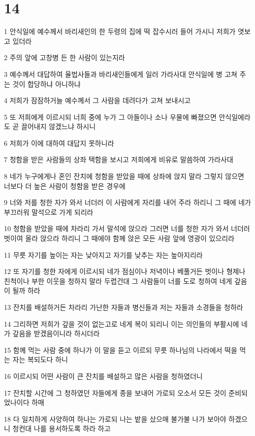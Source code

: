 \chapter{14}

\par 1 안식일에 예수께서 바리새인의 한 두령의 집에 떡 잡수시러 들어 가시니 저희가 엿보고 있더라
\par 2 주의 앞에 고창병 든 한 사람이 있는지라
\par 3 예수께서 대답하여 율법사들과 바리새인들에게 일러 가라사대 안식일에 병 고쳐 주는 것이 합당하냐 아니하냐
\par 4 저희가 잠잠하거늘 예수께서 그 사람을 데려다가 고쳐 보내시고
\par 5 또 저희에게 이르시되 너희 중에 누가 그 아들이나 소나 우물에 빠졌으면 안식일에라도 곧 끌어내지 않겠느냐 하시니
\par 6 저희가 이에 대하여 대답지 못하니라
\par 7 청함을 받은 사람들의 상좌 택함을 보시고 저희에게 비유로 말씀하여 가라사대
\par 8 네가 누구에게나 혼인 잔치에 청함을 받았을 때에 상좌에 앉지 말라 그렇지 않으면 너보다 더 높은 사람이 청함을 받은 경우에
\par 9 너와 저를 청한 자가 와서 너더러 이 사람에게 자리를 내어 주라 하리니 그 때에 네가 부끄러워 말석으로 가게 되리라
\par 10 청함을 받았을 때에 차라리 가서 말석에 앉으라 그러면 너를 청한 자가 와서 너더러 벗이여 올라 앉으라 하리니 그 때에야 함께 앉은 모든 사람 앞에 영광이 있으리라
\par 11 무릇 자기를 높이는 자는 낮아지고 자기를 낮추는 자는 높아지리라
\par 12 또 자기를 청한 자에게 이르시되 네가 점심이나 저녁이나 베풀거든 벗이나 형제나 친척이나 부한 이웃을 청하지 말라 두렵건대 그 사람들이 너를 도로 청하여 네게 갚음이 될까 하라
\par 13 잔치를 배설하거든 차라리 가난한 자들과 병신들과 저는 자들과 소경들을 청하라
\par 14 그리하면 저희가 갚을 것이 없는고로 네게 복이 되리니 이는 의인들의 부활시에 네가 갚음을 받겠음이니라 하시더라
\par 15 함께 먹는 사람 중에 하나가 이 말을 듣고 이르되 무릇 하나님의 나라에서 떡을 먹는 자는 복되도다 하니
\par 16 이르시되 어떤 사람이 큰 잔치를 배설하고 많은 사람을 청하였더니
\par 17 잔치할 시간에 그 청하였던 자들에게 종을 보내어 가로되 오소서 모든 것이 준비되었나이다 하매
\par 18 다 일치하게 사양하여 하나는 가로되 나는 밭을 샀으매 불가불 나가 보아야 하겠으니 청컨대 나를 용서하도록 하라 하고
